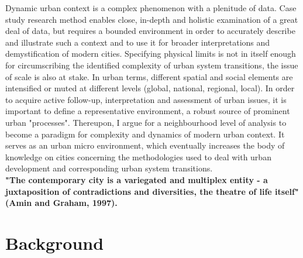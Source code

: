 \documentclass[11pt]{report}
\begin{document}
Dynamic urban context is a complex phenomenon with a plenitude of data. Case study research method enables close, in-depth and holistic examination of a great deal of data, but requires a bounded environment in order to accurately describe and illustrate such a context and to use it for broader interpretations and demystification of modern cities. Specifying physical limits is not in itself enough for circumscribing the identified complexity of urban system transitions, the issue of scale is also at stake. In urban terms, different spatial and social elements are intensified or muted at different levels (global, national, regional, local). In order to acquire active follow-up, interpretation and assessment of urban issues, it is important to define a representative environment, a robust source of prominent urban "processes". Thereupon, I argue for a neighbourhood level of analysis to become a paradigm for complexity and dynamics of modern urban context. It serves as an urban micro environment, which eventually increases the body of knowledge on cities concerning the methodologies used to deal with urban development and corresponding urban system transitions.
\\
\textbf{"The contemporary city is a variegated and multiplex entity - a juxtaposition of contradictions and diversities, the theatre of life itself" (Amin and Graham, 1997).}

\section{Background}
\end{document}
